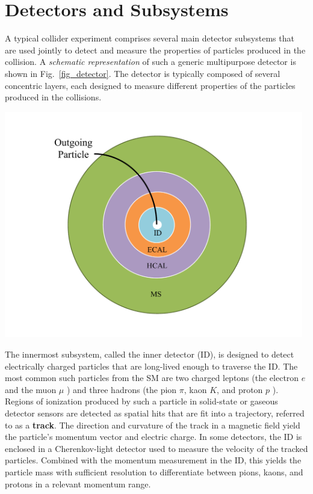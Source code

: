\section{Detectors and Subsystems}

A typical collider experiment comprises several main detector subsystems that are used jointly to detect and measure the properties of particles produced in the collision. A \textit{schematic representation} of such a generic multipurpose detector is shown in Fig.~\ref{fig_detector}. The detector is typically composed of several concentric layers, each designed to measure different properties of the particles produced in the collisions. 

\begin{center}
	\includegraphics[width=0.98\textwidth]{Images/transversal_detector.pdf}
	\label{fig_detector}
\end{center}

The innermost subsystem, called the inner detector (ID), is designed to detect electrically charged particles that are long-lived enough to traverse the ID. The most common such particles from the SM are two charged leptons (the electron $e$ and the muon $\mu$ ) and three hadrons (the pion $\pi$, kaon $K$, and proton $p$ ). Regions of ionization produced by such a particle in solid-state or gaseous detector sensors are detected as spatial hits that are fit into a trajectory, referred to as a \textbf{track}. The direction and curvature of the track in a magnetic field yield the particle's momentum vector and electric charge. In some detectors, the ID is enclosed in a Cherenkov-light detector used to measure the velocity of the tracked particles. Combined with the momentum measurement in the ID, this yields the particle mass with sufficient resolution to differentiate between pions, kaons, and protons in a relevant momentum range.

